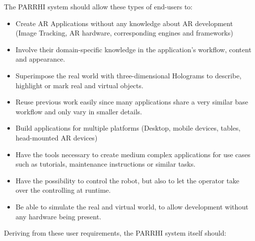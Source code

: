 The PARRHI system should allow these types of end-users to:
\begin{itemize}
	\setlength\itemsep{-1em}
	\item Create AR Applications without any knowledge about AR development (Image Tracking, AR hardware, corresponding engines and frameworks)
	\item Involve their domain-specific knowledge in the application's workflow, content and appearance.
	\item Superimpose the real world with three-dimensional Holograms to describe, highlight or mark real and virtual objects.
	\item Reuse previous work easily since many applications share a very similar base workflow and only vary in smaller details.
	\item Build applications for multiple platforms (Desktop, mobile devices, tables, head-mounted AR devices) 
	\item Have the tools necessary to create medium complex applications for use cases such as tutorials, maintenance instructions or similar tasks.
	\item Have the possibility to control the robot, but also to let the operator take over the controlling at runtime.
	\item Be able to simulate the real and virtual world, to allow development without any hardware being present. 
\end{itemize}

Deriving from these user requirements, the PARRHI system itself should:


